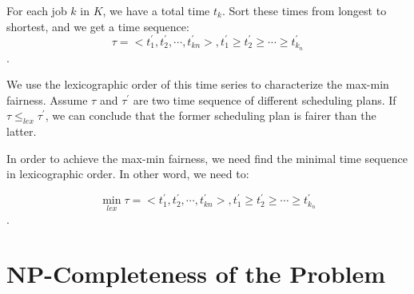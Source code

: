 \documentclass{llncs}
\begin{document}
For each job $ k $ in $ K $, we have a total time $ t_k $. Sort these times from longest to shortest, and we get a time sequence:
 $$ \tau = <t^{\prime}_1,t^{\prime}_2, \cdots, t^{\prime}_{kn}> , t^{\prime}_1 \geqslant t^{\prime}_2 \geqslant \cdots \geqslant t^{\prime}_{k_n}$$.

We use the lexicographic order of this time series to characterize the max-min fairness. Assume $ \tau $ and $ \tau^{\prime} $ are two time sequence of different scheduling plans. If $ \tau \leqslant_{lex} \tau^{\prime} $, we can conclude that the former scheduling plan is fairer than the latter. 

In order to achieve the max-min fairness, we need find the minimal time sequence in lexicographic order. In other word, we need to:

$$ \min\limits_{lex}  \tau = <t^{\prime}_1,t^{\prime}_2, \cdots, t^{\prime}_{kn}> , t^{\prime}_1 \geqslant t^{\prime}_2 \geqslant \cdots \geqslant t^{\prime}_{k_n} $$.

\section{NP-Completeness of the Problem}
\end{document}
